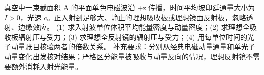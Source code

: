 真空中一束截面积 A 的平面单色电磁波沿 +z 传播，时间平均坡印廷通量大小为 \(I>0\)，光速 c。正入射到足够大、静止的理想吸收板或理想镜面反射板，忽略透射、边缘效应。
(1) 求入射波单位体积平均能量密度与动量密度；(2) 求理想全吸收板辐射压与受力；(3) 求理想全反射镜的辐射压与受力；(4) 用每单位时间的光子动量账目核验两者的倍数关系。
补充要求：分别从经典电磁动量通量和单光子动量变化出发核对结果；严格区分能量被吸收与动量反向的情况，理想反射镜不需要额外消耗入射光能量。
